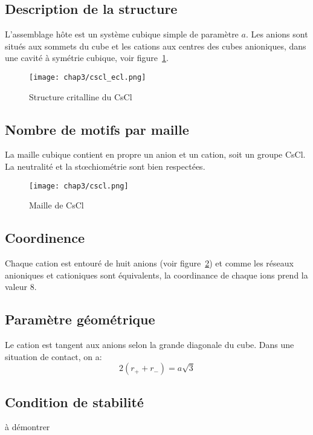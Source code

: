 \subsection{Description de la structure}
L'assemblage hôte est un système cubique simple de paramètre $a$. Les anions sont
situés aux sommets du cube et les cations aux centres des cubes anioniques, dans une
cavité à symétrie cubique, voir figure~\ref{fig:3_cscl_struct}.
\begin{figure}
    \centering
    \texttt{[image: chap3/cscl\_ecl.png]}
    \caption{Structure critalline du CsCl}\label{fig:3_cscl_struct}
\end{figure}


\subsection{Nombre de motifs par maille}
La maille cubique contient en propre un anion et un cation, soit un groupe CsCl.
La neutralité et la st\oe chiométrie sont bien respectées.
\begin{figure}
    \centering
    \texttt{[image: chap3/cscl.png]}
    \caption{Maille de CsCl}\label{fig:3_cscl_maille}
\end{figure}

\subsection{Coordinence}
Chaque cation est entouré de huit anions (voir figure~\ref{fig:3_cscl_maille})
et comme les réseaux anioniques et cationiques sont équivalents, la coordinance
de chaque ions prend la valeur 8.


\subsection{Paramètre géométrique}
Le cation est tangent aux anions selon la grande diagonale du cube. Dans une
situation de contact, on a:
\begin{equation}
    2(r_+ + r_-) = a\sqrt{3}
    \label{eq:3_cscl_ar+r-}
\end{equation}


\subsection{Condition de stabilité}
à démontrer




















